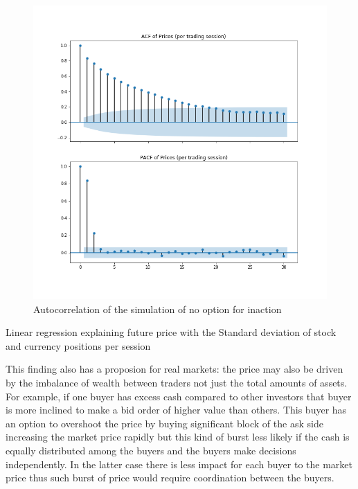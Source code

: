 \begin{figure}
    \includegraphics[width=\linewidth]{plots/forcesub_autocorrelation.png}
    \caption{Autocorrelation of the simulation of no option for inaction}
    \label{fig:forcesub_autocorr}
\end{figure}

\begin{table}
    \caption{Linear regression explaining future price with the Standard deviation of stock and currency positions per session}
    \label{tbl:price_explanation}
\end{table}

This finding also has a proposion for real markets: the price may also be driven by the imbalance of wealth between traders 
not just the total amounts of assets. For example, if one buyer has excess cash compared to other investors that buyer is more 
inclined to make a bid order of higher value than others. This buyer has an option to overshoot the price by buying 
significant block of the ask side increasing the market price rapidly but this kind of burst less likely if the cash 
is equally distributed among the buyers and the buyers make decisions independently. In the latter case there is less
impact for each buyer to the market price thus such burst of price would require coordination between the buyers.

